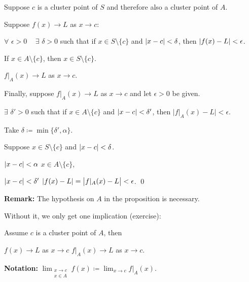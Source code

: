 \documentclass[10pt,aspectratio=149]{beamer}
\begin{document}
\begin{frame}

Suppose $c$ is a cluster point of $S$ and therefore also a cluster point of $A$.

\pause
\medskip

Suppose $f(x) \to L$ as $x \to c$:

\pause
$\forall$ $\epsilon > 0$ ~ $\exists$ $\delta > 0$ such that if $x \in S \setminus \{ c \}$
and $\left\lvert {x-c} \right\rvert < \delta$, then $\left\lvert {f(x)-L} \right\rvert < \epsilon$.

\pause
If $x \in A \setminus \{ c \}$, then $x \in S \setminus \{ c \}$.

\pause
\thus \quad $f|_A(x) \to L$ as $x \to c$.

\pause
\medskip

Finally, suppose $f|_A(x) \to L$ as $x \to c$ and let $\epsilon > 0$ be
given.

\pause
$\exists$ $\delta' > 0$ such that if $x \in A \setminus \{ c \}$
and $\left\lvert {x-c} \right\rvert < \delta'$, then $\bigl\lvert f|_A(x)-L \bigr\rvert < \epsilon$.

\pause
Take $\delta \coloneqq \min \{ \delta', \alpha \}$.

\pause
Suppose $x \in S \setminus \{ c \}$ and
$\left\lvert {x-c} \right\rvert < \delta$.

\pause
$\left\lvert {x-c} \right\rvert < \alpha$ \wthus $x \in A \setminus \{ c \}$,

\pause
$\left\lvert {x-c} \right\rvert < \delta'$ \wthus $\left\lvert {f(x)-L} \right\rvert = \bigl\lvert f|_A(x)-L \bigr\rvert < \epsilon$.
\qed

\pause
\medskip

\textbf{Remark:}
The hypothesis on $A$ in the proposition is necessary.

\pause
Without it, we only get one implication (exercise):

\pause
Assume $c$ is a cluster point of $A$, then

$f(x) \to L$ as $x \to c$
\wthus
$f|_A(x) \to L$ as $x \to c$.

\pause
\medskip

\textbf{Notation:}
\quad $\displaystyle
\lim_{\substack{x \to c\\x \in A}} f(x) \coloneqq \lim_{x \to c} f|_A(x)$.

\end{frame}
\end{document}
